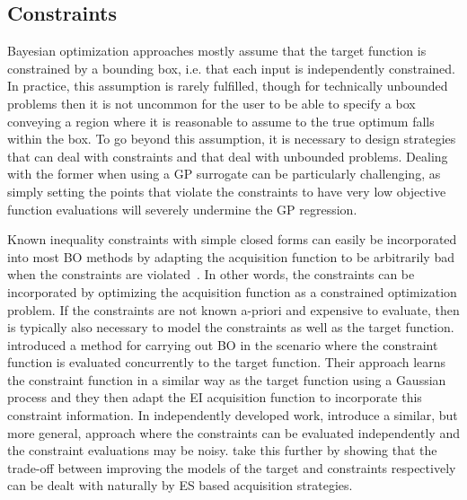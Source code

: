 \subsection{Constraints}
\label{sec:opt:BO:exten:constraints}

Bayesian optimization approaches mostly assume that the target function
is constrained by a bounding box, i.e. that each input is independently constrained.
In practice, this assumption is rarely fulfilled, though for technically unbounded 
problems then it is not uncommon
for the user to be able to specify a box conveying a region where it is reasonable to
assume to the true optimum falls within the box.  To go beyond this assumption, it is
necessary to design strategies that can deal with constraints and  that deal
with unbounded problems.  Dealing with the former when using a GP surrogate can
be particularly challenging, as simply setting the points that violate the constraints
to have very low objective function evaluations will severely undermine the GP
regression.

Known inequality constraints with simple closed forms can easily be incorporated
into most BO methods by adapting the acquisition function to be arbitrarily bad when the
constraints are violated~\citep{gramacy4027optimization}.  In other words, the constraints
can be incorporated by optimizing the acquisition function as a constrained optimization
problem.  If the constraints are not known a-priori  and expensive to evaluate, then
is typically also necessary to model the constraints as well as the target function.
\cite{gardner2014bayesian} introduced a method for carrying out BO in the scenario where
the constraint function is evaluated concurrently to the target function.  Their approach learns
the constraint function in a similar way as the target function using
a Gaussian process and they then adapt the EI acquisition function to incorporate this constraint
information.  In independently developed work, \cite{gelbart2014bayesian} introduce a similar, but more
general, approach where the constraints can be evaluated independently and the constraint
evaluations may be noisy.  \cite{hernandez2016general} take this further by showing that
the trade-off between improving the models of the target and
constraints respectively can be dealt with naturally by ES based acquisition strategies.

